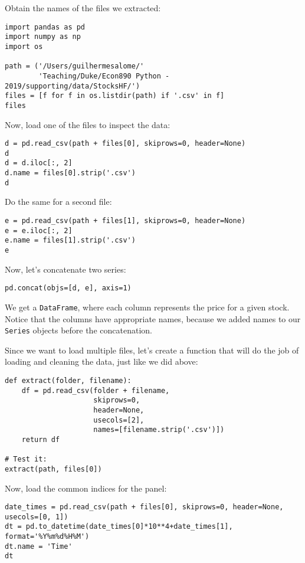 \documentclass[12pt, a4paper]{article}
\begin{document}
Obtain the names of the files we extracted:
\lstset{language=jupyter-python,label= ,caption= ,captionpos=b,numbers=none}
\begin{lstlisting}
import pandas as pd
import numpy as np
import os

path = ('/Users/guilhermesalome/'
        'Teaching/Duke/Econ890 Python - 2019/supporting/data/StocksHF/')
files = [f for f in os.listdir(path) if '.csv' in f]
files
\end{lstlisting}

Now, load one of the files to inspect the data:
\lstset{language=jupyter-python,label= ,caption= ,captionpos=b,numbers=none}
\begin{lstlisting}
d = pd.read_csv(path + files[0], skiprows=0, header=None)
d
d = d.iloc[:, 2]
d.name = files[0].strip('.csv')
d
\end{lstlisting}

Do the same for a second file:
\lstset{language=jupyter-python,label= ,caption= ,captionpos=b,numbers=none}
\begin{lstlisting}
e = pd.read_csv(path + files[1], skiprows=0, header=None)
e = e.iloc[:, 2]
e.name = files[1].strip('.csv')
e
\end{lstlisting}

Now, let's concatenate two series:
\lstset{language=jupyter-python,label= ,caption= ,captionpos=b,numbers=none}
\begin{lstlisting}
pd.concat(objs=[d, e], axis=1)
\end{lstlisting}
We get a \texttt{DataFrame}, where each column represents the price for a given stock.
Notice that the columns have appropriate names, because we added names to our \texttt{Series} objects before the concatenation.

Since we want to load multiple files, let's create a function that will do the job of loading and cleaning the data, just like we did above:
\lstset{language=jupyter-python,label= ,caption= ,captionpos=b,numbers=none}
\begin{lstlisting}
def extract(folder, filename):
    df = pd.read_csv(folder + filename,
                     skiprows=0,
                     header=None,
                     usecols=[2],
                     names=[filename.strip('.csv')])
    return df

# Test it:
extract(path, files[0])
\end{lstlisting}

Now, load the common indices for the panel:
\lstset{language=jupyter-python,label= ,caption= ,captionpos=b,numbers=none}
\begin{lstlisting}
date_times = pd.read_csv(path + files[0], skiprows=0, header=None, usecols=[0, 1])
dt = pd.to_datetime(date_times[0]*10**4+date_times[1], format='%Y%m%d%H%M')
dt.name = 'Time'
dt
\end{lstlisting}
\end{document}
